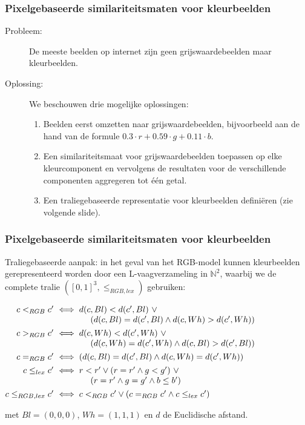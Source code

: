 \documentclass[dutch]{beamer}
\theoremstyle{definition}
\theoremstyle{remark}
\theoremstyle{example}
\begin{document}
{
  \frametitle{Pixelgebaseerde similariteitsmaten voor kleurbeelden}
  
  \begin{description}
     \item[Probleem:] De meeste beelden op internet zijn 
     geen grijswaardebeelden maar kleurbeelden.
     \item[Oplossing:] We beschouwen drie mogelijke oplossingen:
     \begin{enumerate}
       \item Beelden eerst omzetten naar grijswaardebeelden, bijvoorbeeld aan de 
       hand van de formule $0.3 \cdot r + 0.59 \cdot g + 0.11 \cdot b$.
       \item Een similariteitsmaat voor grijswaardebeelden toepassen op elke
       kleurcomponent en vervolgens de resultaten voor de verschillende componenten
       aggregeren tot \'e\'en getal.
       \item Een traliegebaseerde representatie voor kleurbeelden defini\"eren (zie
       volgende slide).
     \end{enumerate}
   \end{description}
}
\frame
{
  \frametitle{Pixelgebaseerde similariteitsmaten voor kleurbeelden}

  Traliegebaseerde aanpak: in het geval van het RGB-model kunnen kleurbeelden 
  gerepresenteerd worden door een L-vaagverzameling in $\mathbb{N}^2$,
  waarbij we de complete tralie $([0,1]^3, \le_{RGB,lex})$ gebruiken:
  \begin{minipage}{\textwidth}
  \vspace{7pt}
  \small
  \centering
  $\begin{array}{@{}r@{}l@{}}
   c <_{RGB} c' & \ \iff d(c,Bl) < d(c',Bl)\ \lor \\
			 & \ \qquad \qquad (d(c,Bl) = d(c',Bl) \land d(c,Wh) > d(c',Wh)) \\[4pt]
   c >_{RGB} c' & \ \iff d(c,Wh) < d(c',Wh)\ \lor \\
			 & \ \qquad \qquad (d(c,Wh) = d(c',Wh) \land d(c,Bl) > d(c',Bl)) \\[4pt]
   c =_{RGB} c' & \ \iff (d(c,Bl) = d(c',Bl) \land d(c,Wh) = d(c',Wh)) \\[4pt]
   c \leq_{lex} c' & \ \iff r < r' \lor (r = r' \land g < g')\ \lor \\
   			 & \ \qquad \qquad (r = r' \land g = g' \land b \leq b') \\[4pt]
   c \leq_{RGB,lex} c' & \ \iff c <_{RGB} c' \lor (c =_{RGB} c' \land c \leq_{lex} c')
  \end{array}$
  \vspace{7pt}
  \end{minipage}
  met $Bl = (0,0,0)$, $Wh = (1,1,1)$ en $d$ de Euclidische afstand.
}
\end{document}
